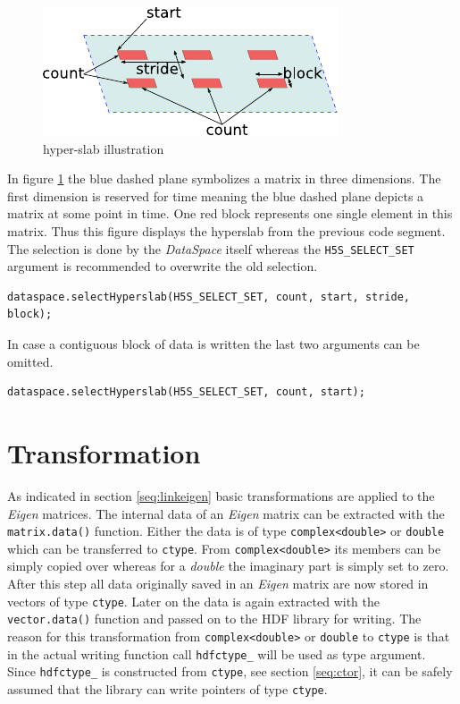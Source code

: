 \begin{figure}[ht!]
\centering
\includegraphics[scale=1.8]{selection.pdf}
\caption{hyper-slab illustration}
\label{fig:hyperslab}
\end{figure}
In figure \ref{fig:hyperslab} the blue dashed plane symbolizes a matrix in three dimensions. The first dimension is reserved for time meaning the blue dashed plane depicts a matrix at some point in time. One red block represents one single element in this matrix. Thus this figure displays the hyperslab from the previous code segment. The selection is done by the \textit{DataSpace} itself whereas the \texttt{H5S\_SELECT\_SET} argument is recommended to overwrite the old selection.
\begin{lstlisting}
dataspace.selectHyperslab(H5S_SELECT_SET, count, start, stride, block);
\end{lstlisting}
In case a contiguous block of data is written the last two arguments can be omitted.
\begin{lstlisting}
dataspace.selectHyperslab(H5S_SELECT_SET, count, start);
\end{lstlisting}


\section{Transformation}
\label{seq:transform}
As indicated in section \ref{seq:linkeigen} basic transformations are applied to the \textit{Eigen} matrices. The internal data of an \textit{Eigen} matrix can be extracted with the \texttt{matrix.data()} function. Either the data is of type \texttt{complex<double>} or \texttt{double} which can be transferred to \texttt{ctype}. From \texttt{complex<double>} its members can be simply copied over whereas for a \textit{double} the imaginary part is simply set to zero. After this step all data originally saved in an \textit{Eigen} matrix are now stored in vectors of type \texttt{ctype}. Later on the data is again extracted with the \texttt{vector.data()} function and passed on to the HDF library for writing. The reason for this transformation from \texttt{complex<double>} or \texttt{double} to \texttt{ctype} is that in the actual writing function call \texttt{hdfctype\_} will be used as type argument. Since \texttt{hdfctype\_} is constructed from \texttt{ctype}, see section \ref{seq:ctor}, it can be safely assumed that the library can write pointers of type \texttt{ctype}.

